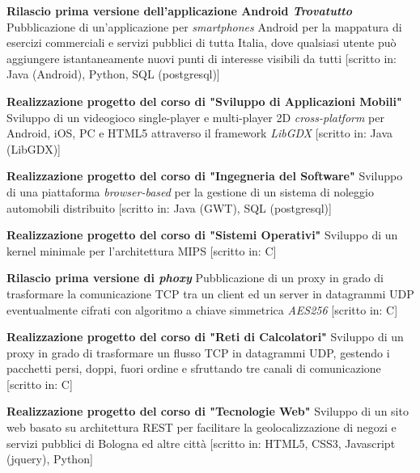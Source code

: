 \documentclass[11pt,a4paper]{moderncv}
\begin{document}
 {\textbf{Rilascio prima versione dell'applicazione Android {\em Trovatutto}} \cite{trovatutto} \newline Pubblicazione di un'applicazione per {\em smartphones} Android per la mappatura di esercizi commerciali e servizi pubblici di tutta Italia, dove qualsiasi utente può aggiungere istantaneamente nuovi punti di interesse visibili da tutti [scritto in: Java (Android), Python, SQL (postgresql)]}

 {\textbf{Realizzazione progetto del corso di "Sviluppo di Applicazioni Mobili"} \cite{shuttle}\newline Sviluppo di un videogioco single-player e multi-player 2D {\em cross-platform} per Android, iOS, PC e HTML5 attraverso il framework {\em LibGDX} [scritto in: Java (LibGDX)]}

 {\textbf{Realizzazione progetto del corso di "Ingegneria del Software"} \cite{lis}\newline Sviluppo di una piattaforma {\em browser-based} per la gestione di un sistema di noleggio automobili distribuito [scritto in: Java (GWT), SQL (postgresql)]}

 {\textbf{Realizzazione progetto del corso di "Sistemi Operativi"} \cite{so}\newline Sviluppo di un kernel minimale per l'architettura MIPS [scritto in: C]}

 {\textbf{Rilascio prima versione di {\em phoxy}} \cite{phoxy}\newline Pubblicazione di un proxy in grado di trasformare la comunicazione TCP tra un client ed un server in datagrammi UDP eventualmente cifrati con algoritmo a chiave simmetrica {\em AES256} [scritto in: C]}

 {\textbf{Realizzazione progetto del corso di "Reti di Calcolatori"} \cite{reti}\newline Sviluppo di un proxy in grado di trasformare un flusso TCP in datagrammi UDP, gestendo i pacchetti persi, doppi, fuori ordine e sfruttando tre canali di comunicazione [scritto in: C]}

 {\textbf{Realizzazione progetto del corso di "Tecnologie Web"} \cite{progettotw} \cite{codicetw}\newline Sviluppo di un sito web basato su architettura REST per facilitare la geolocalizzazione di negozi e servizi pubblici di Bologna ed altre città [scritto in: HTML5, CSS3, Javascript (jquery), Python]}
\end{document}
